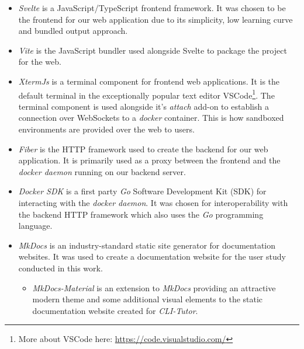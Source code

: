 \begin{itemize}
    \item \textit{Svelte} is a JavaScript/TypeScript frontend framework. It was
        chosen to be the frontend for our web application due to its
        simplicity, low learning curve and bundled output approach.

    \item \textit{Vite} is the JavaScript bundler used alongside Svelte to package the project for the web.

    \item \textit{XtermJs} is a terminal component for frontend web applications.
        It is the default terminal in the exceptionally popular text
        editor VSCode\footnote{More about VSCode here:
        \url{https://code.visualstudio.com/}}. The terminal component is used
        alongside it's \textit{attach} add-on to establish a connection over
        WebSockets to a \textit{docker} container. This is how sandboxed environments
        are provided over the web to users.

    \item \textit{Fiber} is the HTTP framework used to create the backend for
        our web application. It is primarily used as a proxy between the
        frontend and the \textit{docker daemon} running on our backend server.

    \item \textit{Docker SDK} is a first party \textit{Go} Software Development Kit
        (SDK) for interacting with the \textit{docker daemon}. It was chosen for
        interoperability with the backend HTTP framework which also uses the \textit{Go} programming language.

    \item \textit{MkDocs} is an industry-standard static site generator for
        documentation websites. It was used to create a documentation website
        for the user study conducted in this work.
        \begin{itemize}
            \item \textit{MkDocs-Material} is an extension to \textit{MkDocs}
                providing an attractive modern theme and some additional visual
                elements to the static documentation website created for
                \textit{CLI-Tutor}.
        \end{itemize}
\end{itemize}

